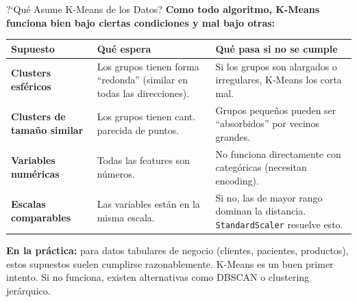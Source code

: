 \documentclass[aspectratio=169, 11pt]{beamer}
\begin{document}
\begin{frame}{?`Qu\'e Asume K-Means de los Datos?}
  \vspace{-4pt}
  {\footnotesize\color{arcaDark}\bfseries
    Como todo algoritmo, K-Means funciona bien bajo ciertas condiciones
    y mal bajo otras:}

  \vspace{6pt}
  {\scriptsize
  \begin{tabular}{@{}p{3.5cm}p{4.5cm}p{4.5cm}@{}}
    \toprule
    \textbf{Supuesto} & \textbf{Qu\'e espera} & \textbf{Qu\'e pasa si no se cumple} \\
    \midrule
    \textbf{Clusters esf\'ericos} & Los grupos tienen forma ``redonda'' (similar en todas las direcciones). & Si los grupos son alargados o irregulares, K-Means los corta mal. \\
    \textbf{Clusters de tama\~no similar} & Los grupos tienen cant. parecida de puntos. & Grupos peque\~nos pueden ser ``absorbidos'' por vecinos grandes. \\
    \textbf{Variables num\'ericas} & Todas las features son n\'umeros. & No funciona directamente con categ\'oricas (necesitan encoding). \\
    \textbf{Escalas comparables} & Las variables est\'an en la misma escala. & Si no, las de mayor rango dominan la distancia. \texttt{StandardScaler} resuelve esto. \\
    \bottomrule
  \end{tabular}
  }

  \vspace{6pt}
  \begin{tcolorbox}[colback=arcaGray, colframe=arcaRed, boxrule=0.5pt, arc=2pt,
    left=6pt, right=6pt, top=4pt, bottom=4pt]
    {\scriptsize\color{arcaDark}
    \faKey\hspace{4pt}\textbf{En la pr\'actica:} para datos tabulares de
    negocio (clientes, pacientes, productos), estos supuestos suelen
    cumplirse razonablemente. K-Means es un buen primer intento. Si no
    funciona, existen alternativas como DBSCAN o clustering jer\'arquico.}
  \end{tcolorbox}
\end{frame}
\end{document}
